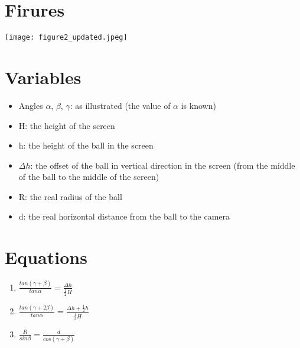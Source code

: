 \documentclass[12pt]{article}
\begin{document}
\maketitle
\section{Firures}
\texttt{[image: figure2\_updated.jpeg]}
\section{Variables}
\begin{itemize}
\item Angles $\alpha$, $\beta$, $\gamma$: as illustrated (the value of $\alpha$ is known)
\item H: the height of the screen
\item h: the height of the ball in the screen
\item $\Delta h$: the offset of the ball in vertical direction in the screen (from the middle of the ball to the middle of the screen)
\item R: the real radius of the ball
\item d: the real horizontal distance from the ball to the camera
\end{itemize}
\section{Equations}
\begin{enumerate}
\item $\frac{tan (\gamma + \beta)}{tan \alpha} = \frac{\Delta h}{\frac{1}{2} H}$
\item $\frac{tan (\gamma + 2\beta)}{tan \alpha} = \frac{\Delta h + \frac{1}{2}h}{\frac{1}{2} H}$ 
\item $\frac{R}{sin \beta} = \frac{d}{cos(\gamma + \beta)}$
\end{enumerate}
\end{document}
